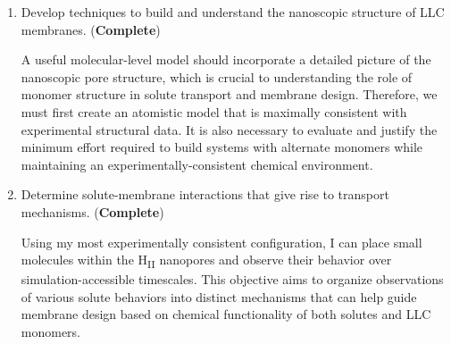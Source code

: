 \documentclass{article}
\begin{document}
  \begin{enumerate}
  
    \item Develop techniques to build and understand the nanoscopic structure
    of LLC membranes. (\textcolor{green!40!olive}{\textbf{Complete}})


    A useful molecular-level model should incorporate a detailed picture 
    of the nanoscopic pore structure, which is crucial to understanding
    the role of monomer structure in solute transport and membrane design.
    Therefore, we must first create an atomistic model that is maximally 
    consistent with experimental structural data. It is also necessary to
    evaluate and justify the minimum effort required to build systems with
    alternate monomers while maintaining an experimentally-consistent 
    chemical environment. 
    


%    
    
    \item Determine solute-membrane interactions that give rise to
    transport mechanisms. (\textcolor{green!40!olive}{\textbf{Complete}})
    
    Using my most experimentally consistent configuration, I can place 
    small molecules within the H\textsubscript{II} nanopores and observe
    their behavior over simulation-accessible timescales. This objective 
    aims to organize observations of various solute behaviors into
    distinct mechanisms that can help guide membrane design based on 
    chemical functionality of both solutes and LLC monomers.
    

\end{enumerate}
\end{document}
